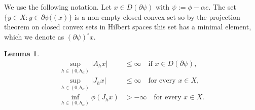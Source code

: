 \documentclass[a4paper,11pt, leqno]{scrreprt} %
\renewcommand{\leq}{\leqslant}
\renewcommand{\leq}{\leqslant}
\theoremstyle{change}
\newcounter{acounter}[chapter]
\newtheorem{lemma}[acounter]{Lemma}
\theoremstyle{nonumberplain}
\begin{document}
We use the following notation. Let $x \in D(\partial \psi)$ with $\psi
:= \phi - \alpha e$. The set $\{y \in X : y \in \partial \psi((x)\}$
is a non-empty closed convex set so by the projection theorem on
closed convex sets in Hilbert spaces this set has a minimal element,
which we denote as $(\partial \psi)^\circ x$.


\begin{lemma}\label{lem:boundsahjh}
\begin{align}
\label{eq:mylem1}\sup_{h \in (0, h_\alpha)} |A_h x| &\leq \infty \quad \text{if $x \in
  D(\partial \psi)$},\\
\label{eq:mylem2}\sup_{h \in (0, h_\alpha)} |J_h x| &\leq \infty \quad \text{for every $x \in
  X$},\\
\label{eq:mylem3}\inf_{h \in (0, h_\alpha)} \phi(J_h x) &> -\infty \quad \text{for every $x
  \in X$}.
\end{align}
\end{lemma}
\end{document}
